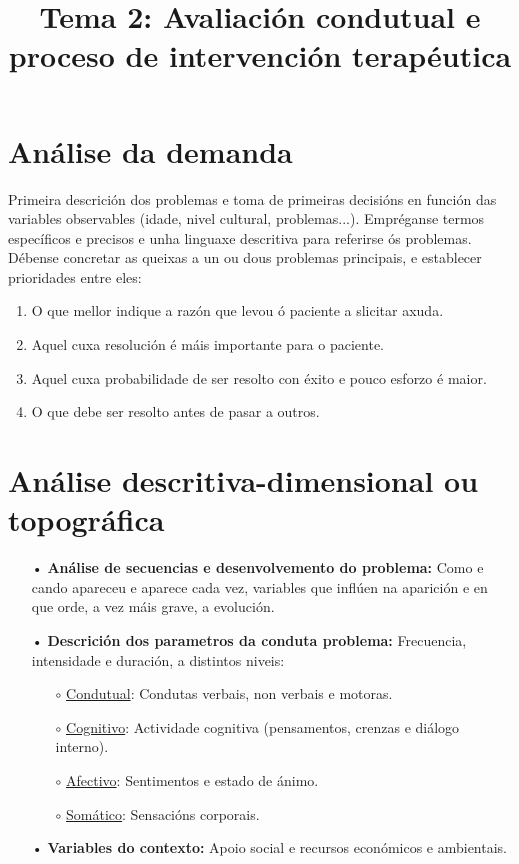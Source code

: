 \documentclass[a4paper,11pt]{article}
\title{Tema 2: Avaliación condutual e proceso de intervención terapéutica}
\date{}
\begin{document}
   

\maketitle 

\section{Análise da demanda}
Primeira descrición dos problemas e toma de primeiras decisións en función das variables observables (idade, nivel cultural, problemas...). Empréganse termos específicos e precisos e unha linguaxe descritiva para referirse ós problemas. Débense concretar as queixas a un ou dous problemas principais, e establecer prioridades entre eles:
\begin{enumerate}
	\item O que mellor indique a razón que levou ó paciente a slicitar axuda.
	\item Aquel cuxa resolución é máis importante para o paciente.
	\item Aquel cuxa probabilidade de ser resolto con éxito e pouco esforzo é maior.
	\item O que debe ser resolto antes de pasar a outros. 
\end{enumerate}

\section{Análise descritiva-dimensional ou topográfica}
\begin{itemize}
	\item[•] \textbf{Análise de secuencias e desenvolvemento do problema:} Como e cando apareceu e 
	aparece cada vez, variables que inflúen na aparición e en que orde, a vez máis grave, a 
	evolución.
	\item[•] \textbf{Descrición dos parametros da conduta problema:} Frecuencia, intensidade e 
	duración, a distintos niveis:
	\begin{itemize}
		\item[$\circ$] \underline{Condutual}: Condutas verbais, non verbais e motoras.
		\item[$\circ$] \underline{Cognitivo}: Actividade cognitiva (pensamentos, crenzas e diálogo 
		interno).
		\item[$\circ$] \underline{Afectivo}: Sentimentos e estado de ánimo.
		\item[$\circ$] \underline{Somático}: Sensacións corporais.
	\end{itemize}
	\item[•] \textbf{Variables do contexto:} Apoio social e recursos económicos e ambientais. 
\end{itemize}
\end{document}

